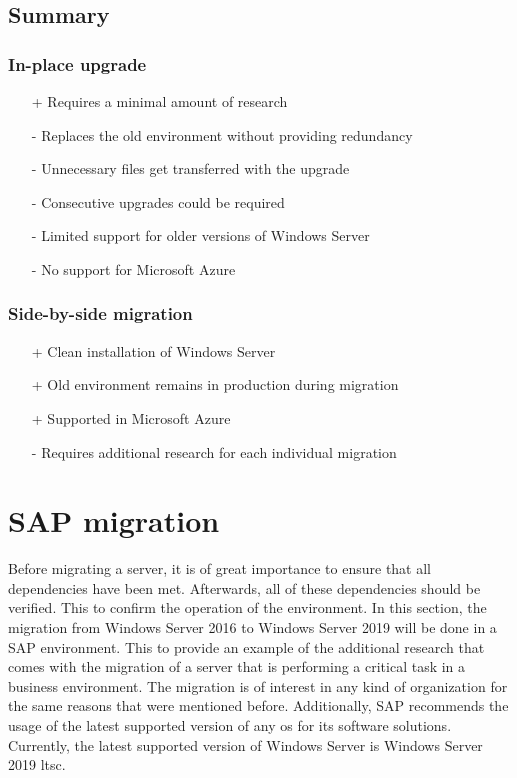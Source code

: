 \subsection{Summary}
\begin{multicols}{2}
	\subsubsection{In-place upgrade}
	\begin{itemize}
		\item[+] Requires a minimal amount of research
		\item[-] Replaces the old environment without providing redundancy
		\item[-] Unnecessary files get transferred with the upgrade
		\item[-] Consecutive upgrades could be required
		\item[-] Limited support for older versions of Windows Server
		\item[-] No support for Microsoft Azure
	\end{itemize}
	\columnbreak
	\subsubsection{Side-by-side migration}
	\begin{itemize}
		\item[+] Clean installation of Windows Server
		\item[+] Old environment remains in production during migration
		\item[+] Supported in Microsoft Azure
		\item[-] Requires additional research for each individual migration
	\end{itemize}
\end{multicols}
\clearpage

\section{SAP migration}
\label{sec:SAP}
Before migrating a server, it is of great importance to ensure that all dependencies have been met. 
Afterwards, all of these dependencies should be verified.
This to confirm the operation of the environment. 
In this section, the migration from Windows Server 2016 to Windows Server 2019 will be done in a SAP environment. 
This to provide an example of the additional research that comes with the migration of a server that is performing a critical task in a business environment. 
The migration is of interest in any kind of organization for the same reasons that were mentioned before. 
Additionally, SAP recommends the usage of the latest supported version of any \acrshort{os} for its software solutions. 
Currently, the latest supported version of Windows Server is Windows Server 2019 \acrshort{ltsc}.

